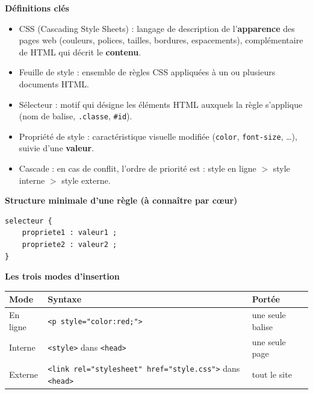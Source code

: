 \documentclass[11pt]{article}
\newcommand{\cle}[1]{{\popxbold\color{popdark}#1}}
\begin{document}
\begin{bilan}
\textbf{Définitions clés}
\begin{itemize}
  \item \cle{CSS} (Cascading Style Sheets) : langage de description de l'\textbf{apparence} des pages web (couleurs, polices, tailles, bordures, espacements), complémentaire de HTML qui décrit le \textbf{contenu}.
  \item \cle{Feuille de style} : ensemble de règles CSS appliquées à un ou plusieurs documents HTML.
  \item \cle{Sélecteur} : motif qui désigne les éléments HTML auxquels la règle s'applique (nom de balise, \texttt{.classe}, \texttt{\#id}).
  \item \cle{Propriété de style} : caractéristique visuelle modifiée (\texttt{color}, \texttt{font-size}, \ldots), suivie d'une \textbf{valeur}.
  \item \cle{Cascade} : en cas de conflit, l'ordre de priorité est : style en ligne $>$ style interne $>$ style externe.
\end{itemize}

\textbf{Structure minimale d'une règle (à connaître par cœur)}
\begin{lstlisting}
selecteur {
    propriete1 : valeur1 ;
    propriete2 : valeur2 ;
}
\end{lstlisting}

\textbf{Les trois modes d'insertion}
\begin{center}
\begin{tabularx}{\linewidth}{|l|X|X|}
\hline
\rowcolor{popblueL} \textbf{Mode} & \textbf{Syntaxe} & \textbf{Portée} \\
\hline
En ligne & \texttt{<p style="color:red;">} & une seule balise \\
\hline
Interne & \texttt{<style>} dans \texttt{<head>} & une seule page \\
\hline
Externe & \texttt{<link rel="stylesheet" href="style.css">} dans \texttt{<head>} & tout le site \\
\hline
\end{tabularx}
\end{center}


\end{bilan}
\end{document}
